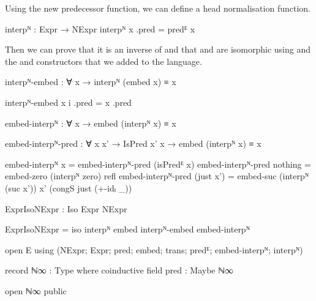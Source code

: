 Using the new predecessor function, we can define a head normalisation function.
\begin{code}
  interpᴺ : Expr → NExpr
  interpᴺ x .pred = predᴱ x
\end{code}
Then we can prove that it is an inverse of  and
that  and  are isomorphic using
 and the  and
 constructors that we added to the language.
\begin{AgdaSuppressSpace}
\begin{code}
  interpᴺ-embed : ∀ x → interpᴺ (embed x) ≡ x
\end{code}
\begin{code}[hide]
  interpᴺ-embed x i .pred = x .pred
\end{code}
\begin{code}
  embed-interpᴺ : ∀ x → embed (interpᴺ x) ≡ x
\end{code}
\begin{code}[hide]
  embed-interpᴺ-pred : ∀ {x x'} → IsPred x' x → embed (interpᴺ x) ≡ x

  embed-interpᴺ x = embed-interpᴺ-pred (isPredᴱ x)
  embed-interpᴺ-pred nothing = embed-zero (interpᴺ zero) refl
  embed-interpᴺ-pred (just x') =
    embed-suc (interpᴺ (suc x')) x' (congS just (+-idₗ _))
\end{code}
\begin{code}
  ExprIsoNExpr : Iso Expr NExpr
\end{code}
\begin{code}[hide]
  ExprIsoNExpr = iso interpᴺ embed interpᴺ-embed embed-interpᴺ
\end{code}
\end{AgdaSuppressSpace}
\begin{code}[hide]
open E using (NExpr; Expr; pred; embed; trans; predᴱ; embed-interpᴺ; interpᴺ)

record ℕ∞ : Type where
  coinductive
  field pred : Maybe ℕ∞

open ℕ∞ public
\end{code}

